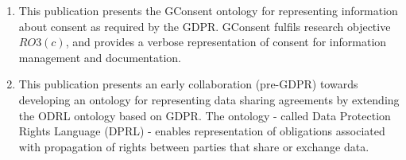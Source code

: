 \begin{enumerate}[start]
    \item \textbf{}
        \newline
        This publication presents the GConsent ontology for representing information about consent as required by the GDPR. GConsent fulfils research objective $RO3(c)$, and provides a verbose representation of consent for information management and documentation.
    \item \textbf{}
        \newline
        This publication presents an early collaboration (pre-GDPR) towards developing an ontology for representing data sharing agreements by extending the ODRL ontology based on GDPR. The ontology - called Data Protection Rights Language (DPRL) - enables representation of obligations associated with propagation of rights between parties that share or exchange data.
\end{enumerate}

